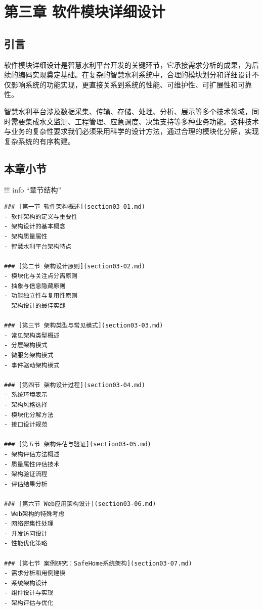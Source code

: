 \hypertarget{ux7b2cux4e09ux7ae0-ux8f6fux4ef6ux6a21ux5757ux8be6ux7ec6ux8bbeux8ba1}{%
\section{第三章 软件模块详细设计}\label{ux7b2cux4e09ux7ae0-ux8f6fux4ef6ux6a21ux5757ux8be6ux7ec6ux8bbeux8ba1}}


\hypertarget{ux5f15ux8a00}{%
\subsection{引言}\label{ux5f15ux8a00}}

软件模块详细设计是智慧水利平台开发的关键环节，它承接需求分析的成果，为后续的编码实现奠定基础。在复杂的智慧水利系统中，合理的模块划分和详细设计不仅影响系统的功能实现，更直接关系到系统的性能、可维护性、可扩展性和可靠性。

智慧水利平台涉及数据采集、传输、存储、处理、分析、展示等多个技术领域，同时需要集成水文监测、工程管理、应急调度、决策支持等多种业务功能。这种技术与业务的复杂性要求我们必须采用科学的设计方法，通过合理的模块化分解，实现复杂系统的有序构建。

\hypertarget{ux672cux7ae0ux5c0fux8282}{%
\subsection{本章小节}\label{ux672cux7ae0ux5c0fux8282}}

!!! info ``章节结构''

\begin{verbatim}
### [第一节 软件架构概述](section03-01.md)
- 软件架构的定义与重要性
- 架构设计的基本概念
- 架构质量属性
- 智慧水利平台架构特点

### [第二节 架构设计原则](section03-02.md)
- 模块化与关注点分离原则
- 抽象与信息隐藏原则
- 功能独立性与复用性原则
- 架构设计的最佳实践

### [第三节 架构类型与常见模式](section03-03.md)
- 常见架构类型概述
- 分层架构模式
- 微服务架构模式
- 事件驱动架构模式

### [第四节 架构设计过程](section03-04.md)
- 系统环境表示
- 架构风格选择
- 模块化分解方法
- 接口设计规范

### [第五节 架构评估与验证](section03-05.md)
- 架构评估方法概述
- 质量属性评估技术
- 架构验证流程
- 评估结果分析

### [第六节 Web应用架构设计](section03-06.md)
- Web架构的特殊考虑
- 网络密集性处理
- 并发访问设计
- 性能优化策略

### [第七节 案例研究：SafeHome系统架构](section03-07.md)
- 需求分析和用例建模
- 系统架构设计
- 组件设计与实现
- 架构评估与优化
\end{verbatim}

